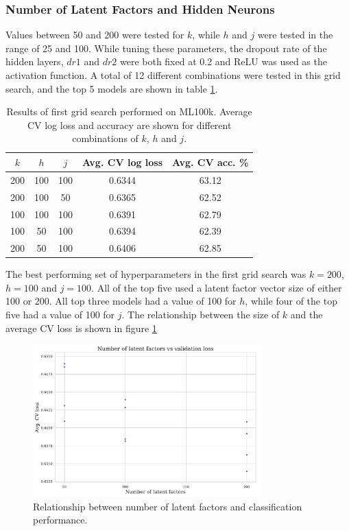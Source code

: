 \subsubsection{Number of Latent Factors and Hidden Neurons}
Values between 50 and 200 were tested for $k$, while $h$ and $j$ were tested in the range of 25 and 100. While tuning these parameters, the dropout rate of the hidden layers, $dr1$ and $dr2$ were both fixed at 0.2 and ReLU was used as the activation function. A total of 12 different combinations were tested in this grid search, and the top 5 models are shown in table \ref{tab:ml100k-grid-results1}.

\begin{table}[H]
\centering
\begin{tabular}{c | c | c | c | c}
\toprule
\textbf{$k$} & \textbf{$h$} & \textbf{$j$} & \textbf{Avg. CV log loss} & \textbf{Avg. CV acc.} \% \\
\midrule
200 & 100 & 100 & 0.6344 & 63.12 \\
\midrule
200 & 100 & 50 & 0.6365 & 62.52 \\
\midrule
100 & 100 & 100 & 0.6391 & 62.79 \\
\midrule
100 & 50 & 100 & 0.6394 & 62.39 \\
\midrule
200 & 50 & 100 & 0.6406 & 62.85 \\
\bottomrule
\end{tabular}
\caption[MovieLens 100k grid search results -- number of nodes]{Results of first grid search performed on ML100k. Average CV log loss and accuracy are shown for different combinations of $k$, $h$ and $j$.}
\label{tab:ml100k-grid-results1}
\end{table}

The best performing set of hyperparameters in the first grid search was $k=200$, $h=100$ and $j=100$. All of the top five used a latent factor vector size of either 100 or 200. All top three models had a value of 100 for $h$, while four of the top five had a value of 100 for $j$. The relationship between the size of $k$ and the average CV loss is shown in figure \ref{fig:5-latent-size}

\begin{figure}[H]
\centering
\includegraphics[width=0.78\textwidth]{Figures/5_ml100k-latent-factors.pdf}
\decoRule
\caption[Number of latent factors vs classification accuracy]{Relationship between number of latent factors and classification performance.}
\label{fig:5-latent-size}
\end{figure}

